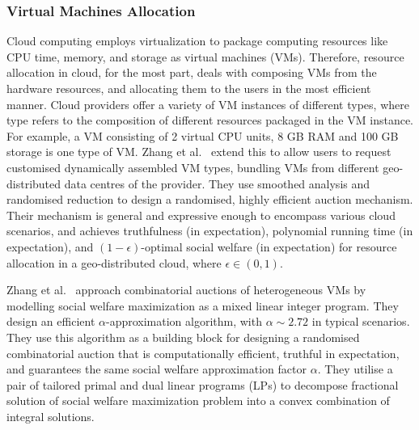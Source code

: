 \subsubsection{Virtual Machines Allocation}
\label{sec__related_work_cloud_vms}

Cloud computing employs virtualization to package computing resources like CPU time, memory, and storage as virtual machines (VMs). 
Therefore, resource allocation in cloud, for the most part, deals with composing VMs 
from the hardware resources, and allocating them to the users in the most efficient manner. 
Cloud providers offer a variety of VM instances of different types, where type refers 
to the composition of different resources packaged in the VM instance. 
For example, a VM consisting of 2 virtual CPU units, 8 GB RAM and 100 GB storage is one type of VM. 
Zhang et al.~\cite{Zhang2015Truthful} extend this to allow users to request 
customised dynamically assembled VM types, 
bundling VMs from different geo-distributed data centres of the provider.
They use smoothed analysis and randomised reduction 
to design a randomised, highly efficient auction mechanism.
Their mechanism is general and expressive enough to encompass various cloud scenarios, 
and achieves truthfulness (in expectation), 
polynomial running time (in expectation), 
and $(1-\epsilon)$-optimal social welfare (in expectation) 
for resource allocation in a geo-distributed cloud, where $\epsilon \in (0,1)$.

Zhang et al.~\cite{Zhang2014Dynamic} approach combinatorial
auctions of heterogeneous VMs by modelling social welfare maximization
as a mixed linear integer program. 
They design an efficient $\alpha$-approximation algorithm,
with $\alpha\! \sim\! 2.72$ in typical scenarios.
They use this algorithm as a building block for designing 
a randomised combinatorial auction that is computationally efficient, 
truthful in expectation, and guarantees the same social welfare approximation factor $\alpha$. 
They utilise a pair of tailored primal
and dual linear programs (LPs) to decompose fractional solution 
of social welfare maximization problem into a convex combination of integral solutions.


